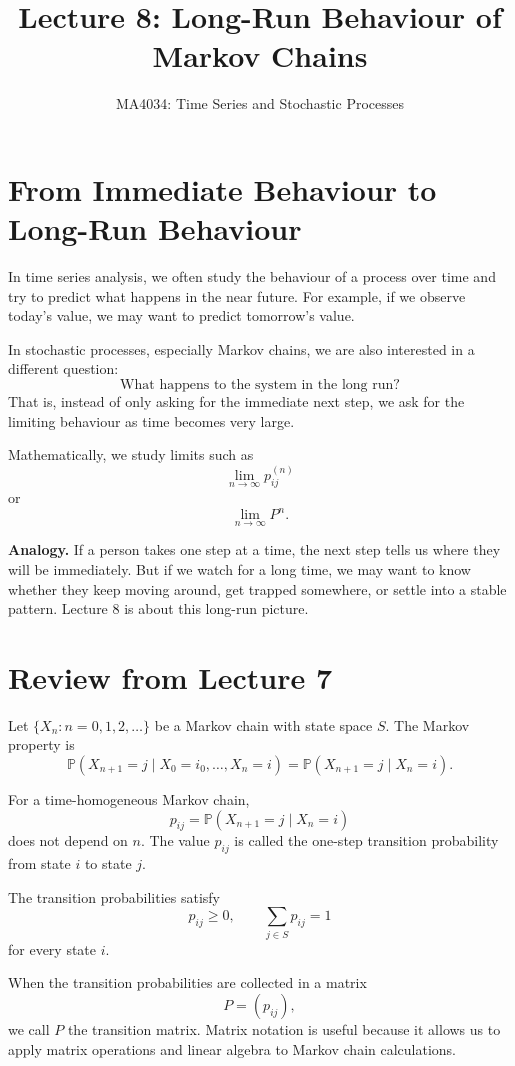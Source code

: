 \documentclass[12pt,a4paper]{article}
\title{\textbf{Lecture 8: Long-Run Behaviour of Markov Chains}}
\author{MA4034: Time Series and Stochastic Processes}
\date{}
\theoremstyle{lecturestyle}
\newcommand{\Prob}{\mathbb{P}}
\begin{document}
\maketitle

\section{From Immediate Behaviour to Long-Run Behaviour}

In time series analysis, we often study the behaviour of a process over time and try to predict what happens in the near future. For example, if we observe today's value, we may want to predict tomorrow's value.

In stochastic processes, especially Markov chains, we are also interested in a different question:
\[
\text{What happens to the system in the long run?}
\]
That is, instead of only asking for the immediate next step, we ask for the limiting behaviour as time becomes very large.

Mathematically, we study limits such as
\[
\lim_{n\to\infty}p_{ij}^{(n)}
\]
or
\[
\lim_{n\to\infty}P^n.
\]

\textbf{Analogy.} If a person takes one step at a time, the next step tells us where they will be immediately. But if we watch for a long time, we may want to know whether they keep moving around, get trapped somewhere, or settle into a stable pattern. Lecture 8 is about this long-run picture.

\section{Review from Lecture 7}

Let $\{X_n:n=0,1,2,\ldots\}$ be a Markov chain with state space $S$. The Markov property is
\[
\Prob(X_{n+1}=j\mid X_0=i_0,\ldots,X_n=i)
=
\Prob(X_{n+1}=j\mid X_n=i).
\]

For a time-homogeneous Markov chain,
\[
p_{ij}=\Prob(X_{n+1}=j\mid X_n=i)
\]
does not depend on $n$. The value $p_{ij}$ is called the one-step transition probability from state $i$ to state $j$.

The transition probabilities satisfy
\[
p_{ij}\geq 0,
\qquad
\sum_{j\in S}p_{ij}=1
\]
for every state $i$.

When the transition probabilities are collected in a matrix
\[
P=(p_{ij}),
\]
we call $P$ the transition matrix. Matrix notation is useful because it allows us to apply matrix operations and linear algebra to Markov chain calculations.
\end{document}
